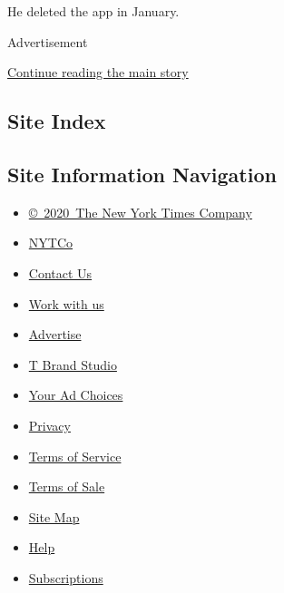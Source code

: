He deleted the app in January.

Advertisement

\protect\hyperlink{after-bottom}{Continue reading the main story}

\hypertarget{site-index}{%
\subsection{Site Index}\label{site-index}}

\hypertarget{site-information-navigation}{%
\subsection{Site Information
Navigation}\label{site-information-navigation}}

\begin{itemize}
\tightlist
\item
  \href{https://help.nytimes.com/hc/en-us/articles/115014792127-Copyright-notice}{©~2020~The
  New York Times Company}
\end{itemize}

\begin{itemize}
\tightlist
\item
  \href{https://www.nytco.com/}{NYTCo}
\item
  \href{https://help.nytimes.com/hc/en-us/articles/115015385887-Contact-Us}{Contact
  Us}
\item
  \href{https://www.nytco.com/careers/}{Work with us}
\item
  \href{https://nytmediakit.com/}{Advertise}
\item
  \href{http://www.tbrandstudio.com/}{T Brand Studio}
\item
  \href{https://www.nytimes.com/privacy/cookie-policy\#how-do-i-manage-trackers}{Your
  Ad Choices}
\item
  \href{https://www.nytimes.com/privacy}{Privacy}
\item
  \href{https://help.nytimes.com/hc/en-us/articles/115014893428-Terms-of-service}{Terms
  of Service}
\item
  \href{https://help.nytimes.com/hc/en-us/articles/115014893968-Terms-of-sale}{Terms
  of Sale}
\item
  \href{https://spiderbites.nytimes.com}{Site Map}
\item
  \href{https://help.nytimes.com/hc/en-us}{Help}
\item
  \href{https://www.nytimes.com/subscription?campaignId=37WXW}{Subscriptions}
\end{itemize}
